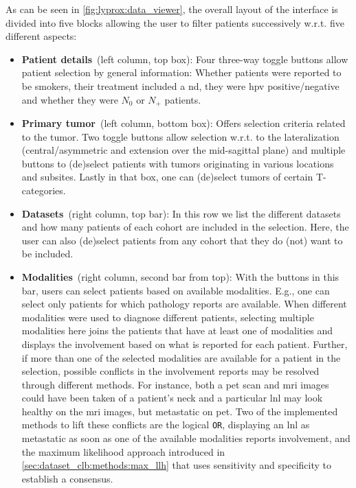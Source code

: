 \documentclass[\relativeRoot/main.tex]{subfiles}
\begin{document}
As can be seen in \cref{fig:lyprox:data_viewer}, the overall layout  of the interface is divided into five blocks allowing the user to filter patients successively w.r.t. five different aspects:

\begin{itemize}
    \item \textbf{Patient details}~(left column, top box): Four three-way toggle buttons allow patient selection by general information: Whether patients were reported to be smokers, their treatment included a \acrlong{nd}, they were \gls{hpv} positive/negative and whether they were $N_0$ or $N_+$ patients.
    \item \textbf{Primary tumor}~(left column, bottom box): Offers selection criteria related to the tumor. Two toggle buttons allow selection w.r.t. to the lateralization (central/asymmetric and extension over the mid-sagittal plane) and multiple buttons to (de)select patients with tumors originating in various locations and subsites. Lastly in that box, one can (de)select tumors of certain T-categories.
    \item \textbf{Datasets}~(right column, top bar): In this row we list the different datasets and how many patients of each cohort are included in the selection. Here, the user can also (de)select patients from any cohort that they do (not) want to be included.
    \item \textbf{Modalities}~(right column, second bar from top): With the buttons in this bar, users can select patients based on available modalities. E.g., one can select only patients for which pathology reports are available. When different modalities were used to diagnose different patients, selecting multiple modalities here joins the patients that have at least one of modalities and displays the involvement based on what is reported for each patient. Further, if more than one of the selected modalities are available for a patient in the selection, possible conflicts in the involvement reports may be resolved through different methods. For instance, both a \gls{pet} scan and \gls{mri} images could have been taken of a patient's neck and a particular \gls{lnl} may look healthy on the \gls{mri} images, but metastatic on \gls{pet}. Two of the implemented methods to lift these conflicts are the logical \texttt{OR}, displaying an \gls{lnl} as metastatic as soon as one of the available modalities reports involvement, and the maximum likelihood approach introduced in \cref{sec:dataset_clb:methods:max_llh} that uses sensitivity and specificity to establish a consensus.

\end{itemize}
\end{document}
